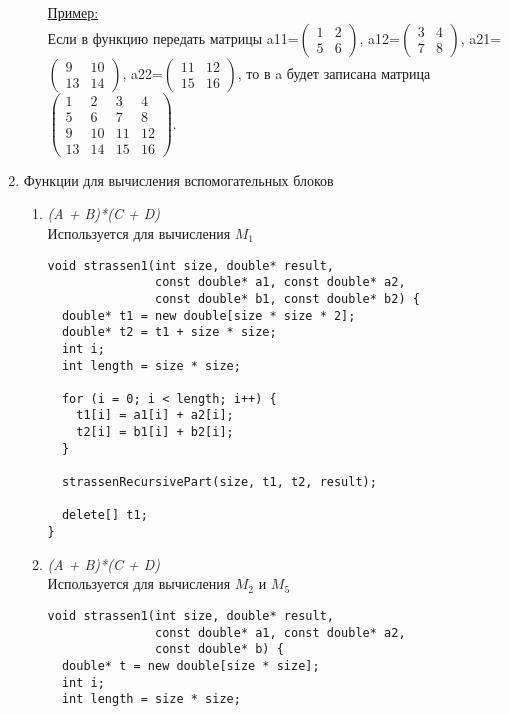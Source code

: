 \documentclass{report}
\begin{document}
\begin{enumerate}
\begin{itemize}
\underline{Пример:}\\
Если в функцию передать матрицы a11=$\begin{pmatrix}1 & 2 \\ 5 & 6\end{pmatrix}$, a12=$\begin{pmatrix}3 & 4 \\7 & 8\end{pmatrix}$, a21=$\begin{pmatrix}9 & 10 \\ 13 & 14\end{pmatrix}$, a22=$\begin{pmatrix}11 & 12 \\ 15 & 16\end{pmatrix}$, то в a будет записана матрица \\
$\begin{pmatrix}1 & 2 & 3 & 4 \\ 5 & 6 & 7 & 8 \\ 9 & 10 & 11 & 12 \\ 13 & 14 & 15 & 16\end{pmatrix}$.
\end{itemize}

\item Функции для вычисления вспомогательных блоков
\begin{enumerate}[label*=\arabic*.]
\item \textit{(A + B)*(C + D)}\\
Используется для вычисления $M_1$
\begin{lstlisting}
void strassen1(int size, double* result,
               const double* a1, const double* a2,
               const double* b1, const double* b2) {
  double* t1 = new double[size * size * 2];
  double* t2 = t1 + size * size;
  int i;
  int length = size * size;

  for (i = 0; i < length; i++) {
    t1[i] = a1[i] + a2[i];
    t2[i] = b1[i] + b2[i];
  }

  strassenRecursivePart(size, t1, t2, result);

  delete[] t1;
}
\end{lstlisting}

\item \textit{(A + B)*(C + D)}\\
Используется для вычисления $M_2$ и $M_5$
\begin{lstlisting}
void strassen1(int size, double* result,
               const double* a1, const double* a2,
               const double* b) {
  double* t = new double[size * size];
  int i;
  int length = size * size;


\end{lstlisting}
\end{enumerate}
\end{enumerate}
\end{document}
